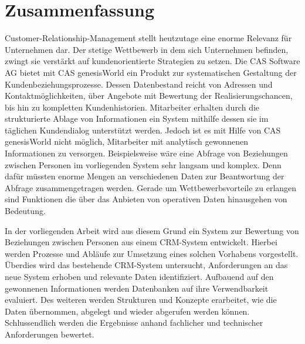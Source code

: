 
\chapter*{\centering Zusammenfassung}


Customer-Relationship-Management stellt heutzutage eine enorme Relevanz für Unternehmen dar. Der stetige Wettbewerb in dem sich Unternehmen
befinden, zwingt sie verstärkt auf kundenorientierte Strategien zu setzen. Die CAS Software AG bietet mit CAS genesisWorld ein Produkt zur systematischen Gestaltung der Kundenbeziehungsprozesse. Dessen Datenbestand reicht von Adressen und Kontaktmöglichkeiten, über Angebote mit Bewertung der Realisierungschancen, bis hin zu kompletten Kundenhistorien. Mitarbeiter erhalten durch die strukturierte Ablage von Informationen ein System mithilfe dessen sie im täglichen Kundendialog unterstützt werden. Jedoch ist es mit Hilfe von CAS genesisWorld nicht möglich, Mitarbeiter mit analytisch gewonnenen Informationen zu versorgen. Beispielsweise wäre eine Abfrage von Beziehungen zwischen Personen im vorliegenden System sehr langsam und komplex. Denn dafür müssten enorme Mengen an verschiedenen Daten zur Beantwortung der Abfrage zusammengetragen werden. Gerade um Wettbewerbsvorteile zu erlangen sind Funktionen die über das Anbieten von operativen Daten hinausgehen von Bedeutung.      

In der vorliegenden Arbeit wird aus diesem Grund ein System zur Bewertung von Beziehungen zwischen Personen aus einem CRM-System entwickelt. Hierbei werden Prozesse und Abläufe zur Umsetzung eines solchen Vorhabens vorgestellt. Überdies wird das bestehende CRM-System untersucht, Anforderungen an das neue System erhoben und relevante Daten identifiziert. Aufbauend auf den gewonnenen Informationen werden Datenbanken auf ihre Verwendbarkeit evaluiert. Des weiteren werden Strukturen und Konzepte erarbeitet, wie die Daten übernommen, abgelegt und wieder abgerufen werden können. Schlussendlich werden die Ergebnisse anhand fachlicher und technischer Anforderungen bewertet.